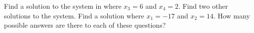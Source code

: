 Find a solution to the system in  where $x_3=6$ and $x_4=2$.  Find two other solutions to the system.  Find a solution where $x_1=-17$ and $x_2=14$.  How many possible answers are there to each of these questions?